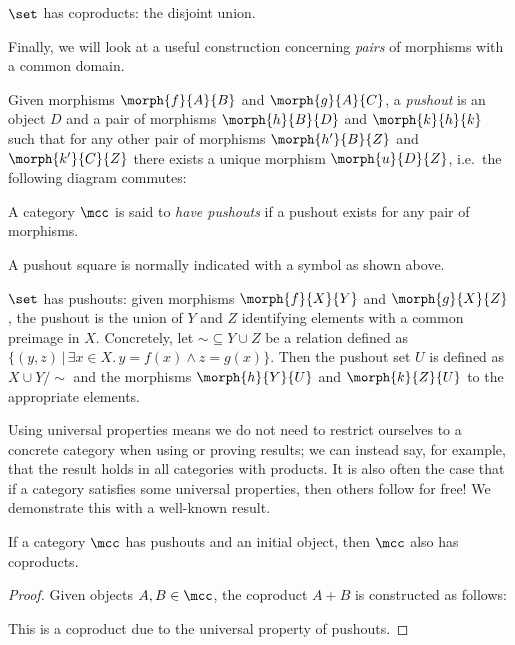 \begin{example}
    \(\set\) has coproducts: the disjoint union.
\end{example}

Finally, we will look at a useful construction concerning \emph{pairs} of
morphisms with a common domain.

\begin{definition}[Pushout]
    Given morphisms \(\morph{f}{A}{B}\) and \(\morph{g}{A}{C}\), a
    \emph{pushout} is an object \(D\) and a pair of morphisms
    \(\morph{h}{B}{D}\) and \(\morph{k}{h}{k}\) such that for any other pair of
    morphisms \(\morph{h^\prime}{B}{Z}\) and \(\morph{k^\prime}{C}{Z}\) there
    exists a unique morphism \(\morph{u}{D}{Z}\), i.e.\ the following diagram
    commutes:
    \begin{center}
        
    \end{center}
    A category \(\mcc\) is said to \emph{have pushouts} if a pushout exists for
    any pair of morphisms.
\end{definition}

A pushout square is normally indicated with a \raisebox{-0.25em}{\(\ulcorner\)}
symbol as shown above.

\begin{example}
    \(\set\) has pushouts: given morphisms \(\morph{f}{X}{Y}\) and
    \(\morph{g}{X}{Z}\), the pushout is the union of \(Y\) and \(Z\) identifying
    elements with a common preimage in \(X\).
    Concretely, let \({\sim} \subseteq Y \cup Z\) be a relation defined as
    \(\{(y, z) \,|\, \exists x \in X.\, y = f(x) \wedge z = g(x)\}\).
    Then the pushout set \(U\) is defined as \(X \cup Y / \sim\) and the
    morphisms \(\morph{h}{Y}{U}\) and \(\morph{k}{Z}{U}\) to the appropriate
    elements.
\end{example}

Using universal properties means we do not need to restrict ourselves to a
concrete category when using or proving results; we can instead say, for
example, that the result holds in all categories with products.
It is also often the case that if a category satisfies some universal
properties, then others follow for free!
We demonstrate this with a well-known result.

\begin{lemma}
    If a category \(\mcc\) has pushouts and an initial object, then \(\mcc\)
    also has coproducts.
\end{lemma}
\begin{proof}
    Given objects \(A,B \in \mcc\), the coproduct \(A + B\) is constructed as
    follows:
    \begin{center}
    \end{center}
    This is a coproduct due to the universal property of pushouts.
\end{proof}